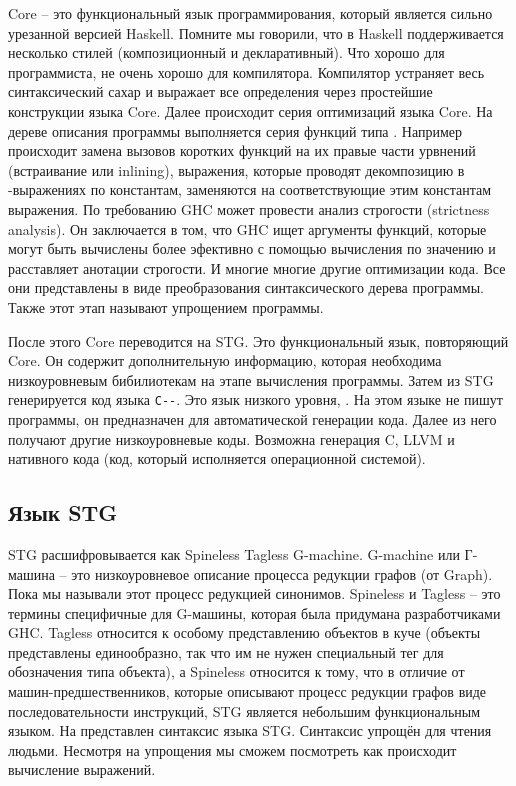 Core -- это функциональный язык программирования, который 
является сильно урезанной версией Haskell. Помните мы говорили, что 
в Haskell поддерживается несколько стилей (композиционный
и декларативный). Что хорошо для программиста, не очень хорошо 
для компилятора. Компилятор устраняет весь синтаксический сахар
и выражает все определения через простейшие конструкции языка Core.
Далее происходит серия оптимизаций языка Core. На дереве
описания программы выполняется серия функций типа  \mbox{}.
Например происходит замена вызовов коротких функций на 
их правые части урвнений (встраивание или inlining), 
выражения, которые проводят декомпозицию в -выражениях 
по константам, заменяются на соответствующие этим константам 
выражения. По требованию GHC может провести анализ строгости
(strictness analysis). Он заключается в том, что GHC
ищет аргументы функций, которые могут быть вычислены 
более эфективно с помощью вычисления по значению и
расставляет анотации строгости. И многие многие другие
оптимизации кода. Все они представлены в виде преобразования
синтаксического дерева программы. Также этот этап называют
упрощением программы. 

После этого Core переводится на STG. Это функциональный
язык, повторяющий Core. Он содержит дополнительную информацию,
которая необходима низкоуровневым бибилиотекам на этапе 
вычисления программы. Затем из STG генерируется код
языка \verb!C--!. Это язык низкого уровня, .
На этом языке не пишут программы, он предназначен для 
автоматической генерации кода. Далее из него получают
другие низкоуровневые коды. Возможна генерация C, LLVM
и нативного кода (код, который исполняется операционной системой). 

\subsection{Язык STG}

STG расшифровывается как Spineless Tagless G-machine. 
G-machine или Г-машина -- это низкоуровневое описание 
процесса редукции графов (от Graph). Пока мы называли этот процесс
редукцией синонимов. Spineless и Tagless -- это термины специфичные
для G-машины, которая была придумана разработчиками GHC.
Tagless относится к особому представлению объектов в куче
(объекты представлены единообразно, так что им не нужен специальный
тег для обозначения типа объекта), а Spineless относится
к тому, что в отличие от машин-предшественников, которые
описывают процесс редукции графов виде последовательности
инструкций, STG является небольшим функциональным языком. 
На  представлен синтаксис языка STG. 
Синтаксис упрощён для чтения людьми. Несмотря на упрощения 
мы сможем посмотреть как происходит вычисление выражений. 
    
